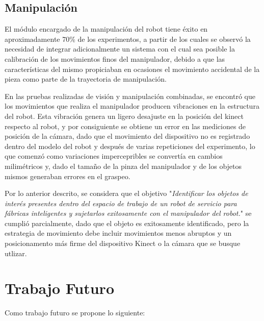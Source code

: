 \subsection{Manipulación}
El módulo encargado de la manipulación del robot tiene éxito en aproximadamente 70\% de los experimentos, a partir de los cuales se observó la necesidad de integrar adicionalmente un sistema con el cual sea posible la calibración de los movimientos finos del manipulador, debido a que las características del mismo propiciaban en ocasiones el movimiento accidental de la pieza como parte de la trayectoria de manipulación. 

En las pruebas realizadas de visión y manipulación combinadas, se encontró que los movimientos que realiza el manipulador producen vibraciones en la estructura del robot. Esta vibración genera un ligero desajuste en la posición del kinect respecto al robot, y por consiguiente se obtiene un error en las mediciones de posición de la cámara, dado que el movimiento del dispositivo no es registrado dentro del modelo del robot y después de varias repeticiones del experimento, lo que comenzó como variaciones impercepribles se convertía en cambios milimétricos y, dado el tamaño de la pinza del manipulador y de los objetos mismos generaban errores en el graspeo.


Por lo anterior descrito, se considera que el objetivo "\textit{Identificar los objetos de interés presentes dentro del espacio de trabajo de un robot de servicio para fábricas inteligentes y sujetarlos exitosamente con el manipulador del robot.}" se cumplió parcialmente, dado que el objeto es exitosamente identificado, pero la estrategia de movimiento debe incluir movimientos menos abruptos y un posicionamento más firme del dispositivo Kinect o la cámara que se busque utlizar.

\newpage
\section{Trabajo Futuro}
Como trabajo futuro se propone lo siguiente:


